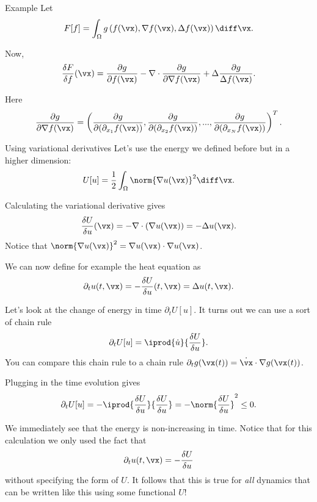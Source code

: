 \begin{frame}{Example}
	Let 
	\[ F[f] = \int_\Omega g\left( f(\vx), \nabla f(\vx), \Delta f(\vx) \right) \diff \vx.  \]
	
	\pause
	Now,
	\[ \frac{\delta F}{\delta f}(\vx) = \frac{\partial g}{\partial f(\vx)} - \nabla \cdot \frac{\partial g}{\partial \nabla f(\vx) }  + \Delta \frac{\partial g}{\Delta f(\vx)}.\]
	
	Here 
	\[ \frac{\partial g}{\partial \nabla f(\vx)} = \left(\frac{\partial g}{\partial (\partial_{x_1}f(\vx))},   
	\frac{\partial g}{\partial (\partial_{x_2}f(\vx))}, ..., \frac{\partial g}{\partial (\partial_{x_N}f(\vx))}
	\right)^T. \]
\end{frame}

\begin{frame}{Using variational derivatives}
	Let's use the energy we defined before but in a higher dimension:
	\[ U[u] = \frac{1}{2} \int_\Omega \norm{\nabla u(\vx)}^2 \diff \vx.  \]
	
	\pause
	Calculating the variational derivative gives 
	\[ \frac{\delta U}{\delta u}(\vx) = -\nabla \cdot (\nabla u(\vx)) = -\Delta u(\vx). \]
	Notice that $ \norm{\nabla u(\vx)}^2 = \nabla u(\vx) \cdot \nabla u(\vx) $.
	
	\pause
	We can now define for example the heat equation as 
	\[ \partial_t u(t,\vx) = -\frac{\delta U}{\delta u} (t,\vx) = \Delta u(t,\vx). \]
\end{frame}

\begin{frame}
	Let's look at the change of energy in time $ \partial_t U[u] $. It turns out we can use a sort of chain rule
	\[ \partial_t U[u] = \iprod{\dot{u}}{\frac{\delta U }{\delta u}}. \]
	You can compare this chain rule to a chain rule $ \partial_t g(\vx(t)) = \dot{\vx}\cdot \nabla g(\vx(t)) $.
	
	\pause
	Plugging in the time evolution gives 
	\[ \partial_t U[u] = - \iprod{\frac{\delta U }{\delta u}}{\frac{\delta U }{\delta u}} = -\norm{\frac{\delta U }{\delta u}}^2 \leq 0. \]
	
	\pause
	We immediately see that the energy is non-increasing in time. Notice that for this calculation we only used the fact that 
	\[ \partial_t u(t,\vx) = -\frac{\delta U}{\delta u} \]
	without specifying the form of $ U $. It follows that this is true for \emph{all} dynamics that can be written like this using some functional $ U $!
\end{frame}

